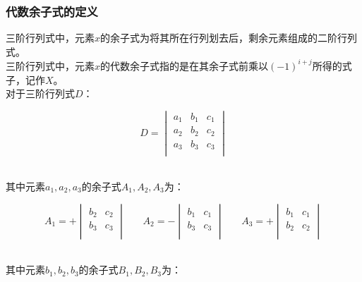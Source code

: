 \documentclass[UTF8]{ctexart}
\begin{document}
\subsubsection{代数余子式的定义}
    三阶行列式中，元素$x$的余子式为将其所在行列划去后，剩余元素组成的二阶行列式。\\[3mm]
    三阶行列式中，元素$x$的代数余子式指的是在其余子式前乘以$(-1)^{i+j}$所得的式子，记作$X$。\\[3mm]
    对于三阶行列式$D$：
    \begin{large}
        \begin{equation*}
            D=
            \begin{vmatrix}
                a_1&b_1&c_1\\
                a_2&b_2&c_2\\
                a_3&b_3&c_3\\
            \end{vmatrix}
        \end{equation*}
    \end{large}\\
    其中元素$a_1,a_2,a_3$的余子式$A_1,A_2,A_3$为：\vspace{5pt}
    \begin{large}
        \begin{equation*}
            A_1=+
            \begin{vmatrix}
                b_2&c_2\\
                b_3&c_3\\
            \end{vmatrix}~~~~~~~~
            A_2=-
            \begin{vmatrix}
                b_1&c_1\\
                b_3&c_3\\
            \end{vmatrix}~~~~~~~~
            A_3=+
            \begin{vmatrix}
                b_1&c_1\\
                b_2&c_2\\
            \end{vmatrix}
        \end{equation*}
    \end{large}\\
    其中元素$b_1,b_2,b_3$的余子式$B_1,B_2,B_3$为：\vspace{5pt}
\end{document}
